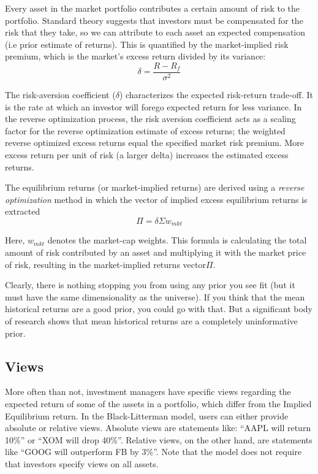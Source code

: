 Every asset in the market portfolio contributes a certain amount of risk to the portfolio. Standard theory suggests that investors must be compensated for the risk that they take, so we can attribute to each asset an expected compensation (i.e prior estimate of returns). This is quantified by the market-implied risk premium, which is the market’s excess return divided by its variance:
\begin{equation}
\delta = \frac{R−R_f}{\sigma^2}
\end{equation}

The risk-aversion coefficient ($\delta$) characterizes the expected risk-return trade-off. It is the rate at which an investor will forego expected return for less variance. In the reverse optimization process, the risk aversion coefficient acts as a scaling factor for the reverse optimization estimate of excess returns; the weighted reverse optimized excess returns equal the specified market risk premium. More excess return per unit of risk (a larger delta) increases the estimated excess returns.

The equilibrium returns (or market-implied returns) are derived using a \emph{reverse optimization} method in which the vector of implied excess equilibrium returns is extracted
\begin{equation}
\Pi=\delta \Sigma w_{mkt}
\end{equation}

Here, $w_{mkt}$ denotes the market-cap weights. This formula is calculating the total amount of risk contributed by an asset and multiplying it with the market price of risk, resulting in the market-implied returns vector$\Pi$.

Clearly, there is nothing stopping you from using any prior you see fit (but it must have the same dimensionality as the universe). If you think that the mean historical returns are a good prior, you could go with that. But a significant body of research shows that mean historical returns are a completely uninformative prior.

\subsection{Views}
More often than not, investment managers have specific views regarding the expected return of some of the assets in a portfolio, which differ from the Implied Equilibrium return. 
In the Black-Litterman model, users can either provide absolute or relative views. Absolute views are statements like: “AAPL will return 10\%” or “XOM will drop 40\%”. Relative views, on the other hand, are statements like “GOOG will outperform FB by 3\%”.
Note that the model does not require that investors specify views on all assets.

